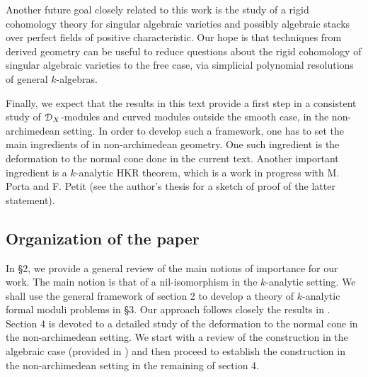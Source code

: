 \documentclass[10pt,a4paper,reqno]{amsart} %
\theoremstyle{plain}
\theoremstyle{definition}
\theoremstyle{remark}
\numberwithin{equation}{section}
\begin{document}
Another future goal closely related to this work is the study of a rigid cohomology theory for singular algebraic varieties and possibly algebraic stacks over perfect fields of
positive characteristic. Our hope is that techniques from derived geometry can be useful to reduce questions about the rigid cohomology of singular algebraic varieties to the free case, via simplicial polynomial resolutions
of general $k$-algebras.

Finally, we expect that the results in this text provide a first step in a consistent study of $\mathcal D_X$-modules and curved modules outside the smooth case, in the non-archimedean setting.
In order to develop such a framework, one has to set the main ingredients of \cite{ben2012loop} in non-archimedean geometry. One such ingredient is the deformation to the normal cone done
in the current text. Another important ingredient is a $k$-analytic HKR theorem, which is a work in progress with M. Porta and F. Petit (see the author's thesis \cite{ferreira2019modeles}
for a sketch of proof of the latter statement).

\subsection{Organization of the paper}
In \S 2, we provide a general review of the main notions of importance for our work. The main notion is that of a nil-isomorphism in the $k$-analytic setting.
We shall use the general framework of section 2 to develop a theory of $k$-analytic formal moduli problems in \S 3. Our approach follows closely the results
in \cite{Gaitsgory_Study_II}. Section 4 is devoted to a detailed study of the deformation to the normal cone in the non-archimedean setting. We start with a review of the construction
in the algebraic case (provided in \cite{Gaitsgory_Study_II}) and then proceed to establish the construction in the non-archimedean setting in the remaining of section 4.
\end{document}

